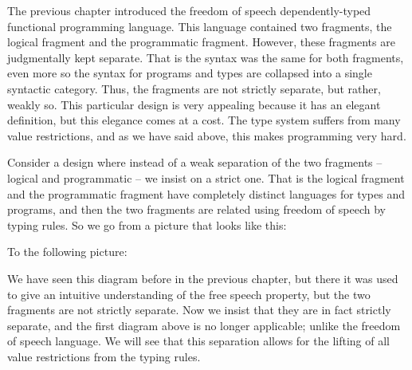 


\renewcommand{\Sepdrulename}[1]{\scriptsize \textsc{#1}}
\renewcommand{\SepUdrulename}[1]{\scriptsize \textsc{#1}}

The previous chapter introduced the freedom of speech
dependently-typed functional programming language. This language
contained two fragments, the logical fragment and the programmatic
fragment.  However, these fragments are judgmentally kept separate.
That is the syntax was the same for both fragments, even more so the
syntax for programs and types are collapsed into a single syntactic
category.  Thus, the fragments are not strictly separate, but rather,
weakly so.  This particular design is very appealing because it has an
elegant definition, but this elegance comes at a cost.  The type
system suffers from many value restrictions, and as we have said
above, this makes programming very hard.

Consider a design where instead of a weak separation of the two
fragments -- logical and programmatic -- we insist on a strict one.
That is the logical fragment and the programmatic fragment have
completely distinct languages for types and programs, and then the two
fragments are related using freedom of speech by typing rules.  So we
go from a picture that looks like this:
\begin{center}
\end{center}
To the following picture:
\begin{center}
\end{center}
We have seen this diagram before in the previous chapter, but there it
was used to give an intuitive understanding of the free speech
property, but the two fragments are not strictly separate.  Now we
insist that they are in fact strictly separate, and the first diagram
above is no longer applicable; unlike the freedom of speech language.  We
will see that this separation allows for the lifting of all value
restrictions from the typing rules.  


